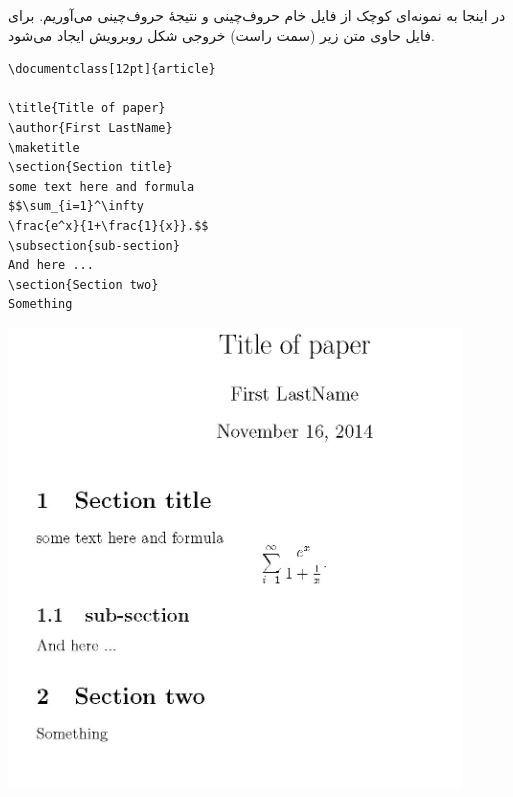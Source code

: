  
 در اینجا به نمونه‌ای کوچک از فایل خام حروف‌چینی و نتیجۀ حروف‌چینی می‌آوریم. 
 برای فایل حاوی متن زیر (سمت راست)
 خروجی شکل روبرویش ایجاد می‌شود.
 \bigpar
 \begin{minipage}{0.4\textwidth}
 \latin \small
 \begin{verbatim}
\documentclass[12pt]{article}

\title{Title of paper}
\author{First LastName}
\maketitle
\section{Section title}
some text here and formula 
$$\sum_{i=1}^\infty 
\frac{e^x}{1+\frac{1}{x}}.$$
\subsection{sub-section}
And here ...
\section{Section two}
Something

 \end{verbatim}
 \end{minipage}
 \begin{minipage}{0.6\textwidth}
 \includegraphics[width=0.9\textwidth]{test-crop}
 \end{minipage}
 
